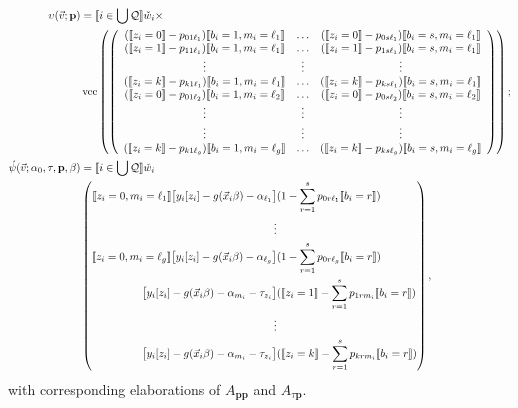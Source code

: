 \documentclass{article}
\DeclarePairedDelimiter{\indicator}{\llbracket}{\rrbracket}
\newcommand{\owt}[1][{[z_{i}]}]{\ensuremath{\check{w}_{i#1}}}
\newcommand{\absorbInterceptsEF}{\upsilon}
\begin{document}
\begin{align}
  \absorbInterceptsEF(\vec{v}; \mathbf{p}) &=
                                             \indicator{i \in \bigcup \mathcal{Q}} \owt[] \times \nonumber \\
  &\operatorname{vec}\left(%
    \left(
    \begin{array}{ccc}
      (\indicator{z_{i}=0}-p_{01\ell_{1}})\indicator{b_{i}=1, m_{i}=\ell_{1}}
      &\ldots
      &
        (\indicator{z_{i}=0}-p_{0s\ell_{1}})\indicator{b_{i}=s, m_{i}=\ell_{1}}
      \\
      (\indicator{z_{i}=1}-p_{11\ell_{1}})\indicator{b_{i}=1, m_{i}=\ell_{1}}
      &\ldots
      &
        (\indicator{z_{i}=1}-p_{1s\ell_{1}})\indicator{b_{i}=s, m_{i}=\ell_{1}}
      \\
      \vdots & \vdots & \vdots \\
      (\indicator{z_{i}=k}-p_{k1\ell_{1}})\indicator{b_{i}=1, m_{i}=\ell_{1}}
      &\ldots
      &
        (\indicator{z_{i}=k}-p_{ks\ell_{1}})\indicator{b_{i}=s, m_{i}=\ell_{1}}\\                                 (\indicator{z_{i}=0}-p_{01\ell_{2}})\indicator{b_{i}=1, m_{i}=\ell_{2}}
      &\ldots
      &
        (\indicator{z_{i}=0}-p_{0s\ell_{2}})\indicator{b_{i}=s, m_{i}=\ell_{2}}
      \\
      \vdots & \vdots & \vdots \\
      \vdots & \vdots & \vdots \\
      (\indicator{z_{i}=k}-p_{k1\ell_{g}})\indicator{b_{i}=1, m_{i}=\ell_{g}}
      &\ldots
      &
        (\indicator{z_{i}=k}-p_{ks\ell_{g}})\indicator{b_{i}=s, m_{i}=\ell_{g}}\\          
    \end{array}
  \right)%
  \right) ;\nonumber \\
  \acute{\psi}(\vec{v}; \alpha_{0}, \tau, \mathbf{p}, \beta) &=
\indicator{i \in \bigcup \mathcal{Q}}\owt[] \nonumber \\
&\left(
  \begin{aligned}                                               
    \indicator{z_{i}=0, m_{i}=\ell_{1}} \big[y_{i}[z_{i}]
    -
    g(\vec{x}_{i}\beta)-\alpha_{\ell_{1}}\big]
    &(
  1 -
   \sum_{r=1}^{s}p_{0r\ell_{1}}\indicator{b_{i}=r}) \\
   \vdots\\
    \indicator{z_{i}=0, m_{i}=\ell_{g}} \big[y_{i}[z_{i}]
    -
    g(\vec{x}_{i}\beta)-\alpha_{\ell_{g}}\big]
    &(
   1 -
   \sum_{r=1}^{s}p_{0r\ell_{g}}\indicator{b_{i}=r}) \\   
    \big[y_{i}[z_{i}]
    -
    g(\vec{x}_{i}\beta)-\alpha_{m_{i}}-\tau_{z_{i}}\big]
    &(
    \indicator{z_{i}=1} - \sum_{r=1}^{s}p_{1rm_{i}}\indicator{b_{i}=r})\\
    \vdots \\
    {}\big[y_{i}[z_{i}]
    - g(\vec{x}_{i}\beta) - \alpha_{m_{i}}-
    \tau_{z_{i}}\big]
    &(\indicator{z_{i}=k}
    - \sum_{r=1}^{s}p_{krm_{i}}\indicator{b_{i}=r})\\
  \end{aligned}
\right), 
\end{align}
with corresponding elaborations of $A_{\mathbf{p}\mathbf{p}}$ and
$A_{\tau \mathbf{p}}$. 
\end{document}
